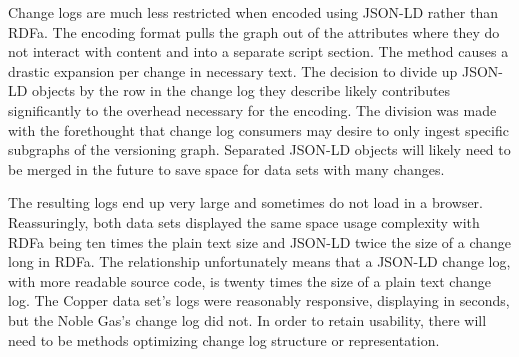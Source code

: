 Change logs are much less restricted when encoded using JSON-LD rather than RDFa.
The encoding format pulls the graph out of the attributes where they do not interact with content and into a separate script section.
The method causes a drastic expansion per change in necessary text.
The decision to divide up JSON-LD objects by the row in the change log they describe likely contributes significantly to the overhead necessary for the encoding.
The division was made with the forethought that change log consumers may desire to only ingest specific subgraphs of the versioning graph.
Separated JSON-LD objects will likely need to be merged in the future to save space for data sets with many changes.

The resulting logs end up very large and sometimes do not load in a browser.
Reassuringly, both data sets displayed the same space usage complexity with RDFa being ten times the plain text size and JSON-LD twice the size of a change long in RDFa.
The relationship unfortunately means that a JSON-LD change log, with more readable source code, is twenty times the size of a plain text change log.
The Copper data set's logs were reasonably responsive, displaying in seconds, but the Noble Gas's change log did not.
In order to retain usability, there will need to be methods optimizing change log structure or representation.